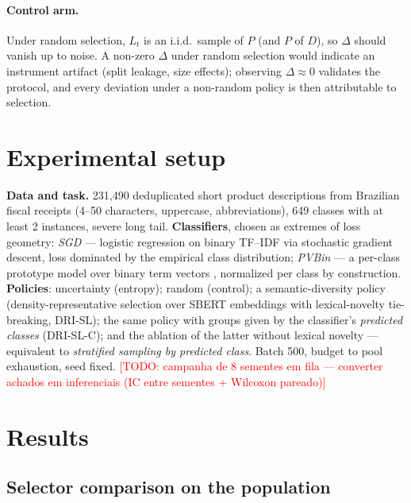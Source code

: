 \documentclass[11pt]{article}
\newcommand{\todo}[1]{\textcolor{red}{[TODO: #1]}}
\begin{document}
\paragraph{Control arm.} Under random selection, $L_t$ is an i.i.d.\ sample
of $P$ (and $P$ of $D$), so $\Delta$ should vanish up to noise. A non-zero
$\Delta$ under random selection would indicate an instrument artifact
(split leakage, size effects); observing $\Delta \approx 0$ validates the
protocol, and every deviation under a non-random policy is then
attributable to selection.

\section{Experimental setup}
\label{sec:setup}

\textbf{Data and task.} 231{,}490 deduplicated short product descriptions
from Brazilian fiscal receipts (4--50 characters, uppercase,
abbreviations), 649 classes with at least 2 instances, severe long tail.
\textbf{Classifiers}, chosen as extremes of loss geometry: \emph{SGD} ---
logistic regression on binary TF--IDF via stochastic gradient descent,
loss dominated by the empirical class distribution; \emph{PVBin} --- a
per-class prototype model over binary term vectors
\citep{Daru2024Dissertacao}, normalized per class by construction.
\textbf{Policies}: uncertainty (entropy); random (control); a
semantic-diversity policy (density-representative selection over SBERT
embeddings with lexical-novelty tie-breaking, DRI-SL); the same policy
with groups given by the classifier's \emph{predicted classes} (DRI-SL-C);
and the ablation of the latter without lexical novelty --- equivalent to
\emph{stratified sampling by predicted class}. Batch 500, budget to pool
exhaustion, seed fixed. \todo{campanha de 8 sementes em fila --- converter
achados em inferenciais (IC entre sementes + Wilcoxon pareado)}

\section{Results}
\label{sec:results}

\subsection{Selector comparison on the population}
\end{document}
